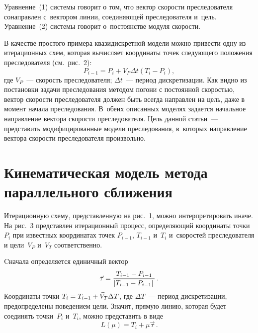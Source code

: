 \begin{multicols}{2}
  Уравнение~(1) системы говорит о том, что вектор скорости 
преследователя сонаправлен с~вектором линии, соединяющей преследователя 
и~цель. Уравнение~(2) сис\-те\-мы говорит о~постоянстве модуля ско\-рости.
  
 




  В качестве простого примера квазидискретной модели можно привести одну 
из итерационных схем, которая вычисляет координаты точек следующего 
положения преследователя (см.\ рис.~2): 
$$
P_{i-1}= P_i+ V_P \Delta t \left (T_i-  P_i\right),
$$
 где $V_P$~--- скорость преследователя; $\Delta t$~--- период 
дискретизации. Как видно из постановки задачи преследования методом погони 
с постоянной скоростью, вектор скорости преследователя должен быть всегда 
направлен на цель, даже в момент начала преследования. В~обеих описанных 
моделях задается начальное направление вектора скорости преследователя. 
Цель данной статьи~--- представить модифицированные модели преследования, 
в~которых направление вектора скорости преследователя произвольно.

\vspace*{-2pt}
   
\section{Кинематическая модель метода параллельного 
сближения}

\vspace*{-2pt}

   Итерационную схему, пред\-став\-лен\-ную на рис.~1, можно интерпретировать 
иначе. На рис.~3 пред\-став\-лен итерационный процесс, определяющий 
координаты точки~$P_i$ при известных координатах точек $P_{i-1}$, $T_{i-1}$ и~$T_i$ и~скоростей преследователя и цели~$V_P$ и~$V_T$ 
соответственно.
   
  Cначала определяется единичный вектор 
  $$
  \vec{\tau} =\displaystyle\frac{\displaystyle T_{i-1} -P_{i-1}\mathstrut}{\displaystyle \left\vert T_{i-1} -P_{i-1}\right\vert\mathstrut}\,.
  $$
   Координаты точки $T_i\hm= T_{i-1}\hm+ \vec{V}_T \Delta T$, где $\Delta 
T$~--- период дискретизации, предопределены поведением цели. Значит, 
прямую линию, которая будет соединять точки~$P_i$ и~$T_i$, можно 
представить в виде 
$$
L(\mu) = T_i+ \mu\vec{\tau}\,. 
$$

\setcounter{figure}{3}
\begin{figure*} %
\vspace*{1pt}
  \begin{center}  
    \mbox{%
\epsfxsize=126.516mm
}


\end{center}
\end{figure*}
\end{multicols}

